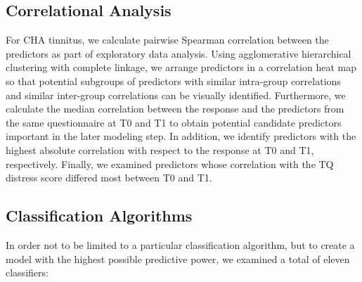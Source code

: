 \documentclass[
  oneside]{book}
\begin{document}
\hypertarget{correlational-analysis}{%
\subsection{Correlational Analysis}\label{correlational-analysis}}

For CHA tinnitus, we calculate pairwise Spearman correlation between the predictors as part of exploratory data analysis.
Using agglomerative hierarchical clustering with complete linkage, we arrange predictors in a correlation heat map so that potential subgroups of predictors with similar intra-group correlations and similar inter-group correlations can be visually identified.
Furthermore, we calculate the median correlation between the response and the predictors from the same questionnaire at T0 and T1 to obtain potential candidate predictors important in the later modeling step.
In addition, we identify predictors with the highest absolute correlation with respect to the response at T0 and T1, respectively.
Finally, we examined predictors whose correlation with the TQ distress score differed most between T0 and T1.

\hypertarget{classification-algorithms}{%
\subsection{Classification Algorithms}\label{classification-algorithms}}

In order not to be limited to a particular classification algorithm, but to create a model with the highest possible predictive power, we examined a total of eleven classifiers:
\end{document}
